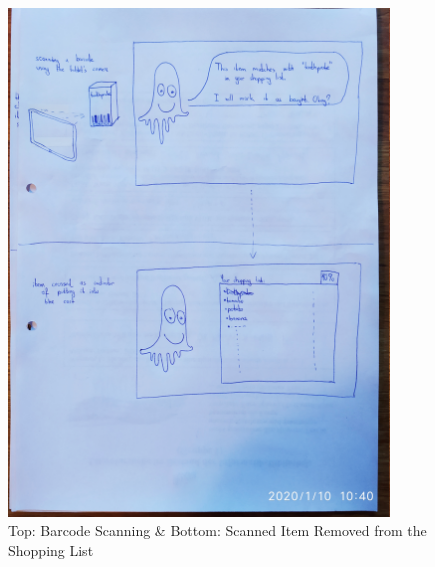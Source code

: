\begin{figure}[H]
	\centering
	\includegraphics[trim={0em 90em 20em 0em}, clip, width=0.9\textwidth]{images/s1/p2.jpg}
	\caption{Top: Barcode Scanning \& Bottom: Scanned Item Removed from the Shopping List}
	\label{s1:barcode}
\end{figure}

